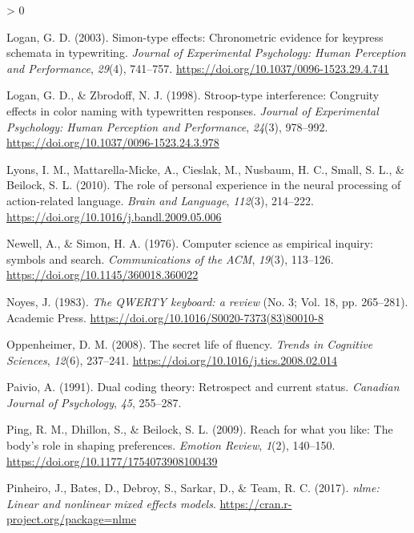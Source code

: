 \documentclass[
  english,
  man,mask]{apa7}
\newlength{\cslhangindent}
\newenvironment{CSLReferences}[2] %
 {%
  \setlength{\parindent}{0pt}
  \ifodd #1 \everypar{\setlength{\hangindent}{\cslhangindent}}\ignorespaces\fi
  \ifnum #2 > 0
  \setlength{\parskip}{#2\baselineskip}
  \fi
 }%
 {}
\begin{document}
\begin{CSLReferences}{1}{0}
\leavevmode\hypertarget{ref-Logan2003}{}%
Logan, G. D. (2003). {Simon-type effects: Chronometric evidence for keypress schemata in typewriting}. \emph{Journal of Experimental Psychology: Human Perception and Performance}, \emph{29}(4), 741--757. \url{https://doi.org/10.1037/0096-1523.29.4.741}

\leavevmode\hypertarget{ref-Logan1998}{}%
Logan, G. D., \& Zbrodoff, N. J. (1998). {Stroop-type interference: Congruity effects in color naming with typewritten responses.} \emph{Journal of Experimental Psychology: Human Perception and Performance}, \emph{24}(3), 978--992. \url{https://doi.org/10.1037/0096-1523.24.3.978}

\leavevmode\hypertarget{ref-Lyons2010}{}%
Lyons, I. M., Mattarella-Micke, A., Cieslak, M., Nusbaum, H. C., Small, S. L., \& Beilock, S. L. (2010). {The role of personal experience in the neural processing of action-related language}. \emph{Brain and Language}, \emph{112}(3), 214--222. \url{https://doi.org/10.1016/j.bandl.2009.05.006}

\leavevmode\hypertarget{ref-Newell1976}{}%
Newell, A., \& Simon, H. A. (1976). {Computer science as empirical inquiry: symbols and search}. \emph{Communications of the ACM}, \emph{19}(3), 113--126. \url{https://doi.org/10.1145/360018.360022}

\leavevmode\hypertarget{ref-Noyes1983}{}%
Noyes, J. (1983). \emph{{The QWERTY keyboard: a review}} (No. 3; Vol. 18, pp. 265--281). Academic Press. \url{https://doi.org/10.1016/S0020-7373(83)80010-8}

\leavevmode\hypertarget{ref-Oppenheimer2008}{}%
Oppenheimer, D. M. (2008). {The secret life of fluency}. \emph{Trends in Cognitive Sciences}, \emph{12}(6), 237--241. \url{https://doi.org/10.1016/j.tics.2008.02.014}

\leavevmode\hypertarget{ref-Paivio1991}{}%
Paivio, A. (1991). {Dual coding theory: Retrospect and current status}. \emph{Canadian Journal of Psychology}, \emph{45}, 255--287.

\leavevmode\hypertarget{ref-Ping2009}{}%
Ping, R. M., Dhillon, S., \& Beilock, S. L. (2009). {Reach for what you like: The body's role in shaping preferences}. \emph{Emotion Review}, \emph{1}(2), 140--150. \url{https://doi.org/10.1177/1754073908100439}

\leavevmode\hypertarget{ref-Pinheiro2017}{}%
Pinheiro, J., Bates, D., Debroy, S., Sarkar, D., \& Team, R. C. (2017). \emph{{nlme: Linear and nonlinear mixed effects models}}. \url{https://cran.r-project.org/package=nlme}


\end{CSLReferences}
\end{document}
